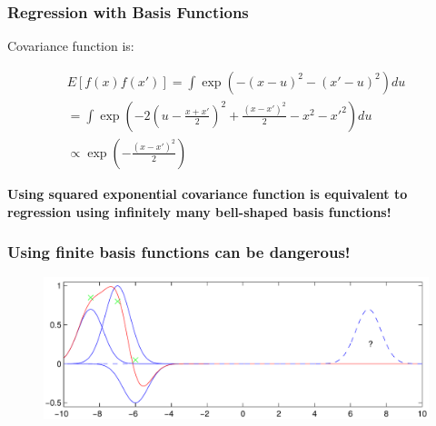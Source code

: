 \documentclass[10pt]{beamer}
\begin{document}
  \begin{frame}
    \frametitle{Regression with Basis Functions}

    Covariance function is:

    \begin{equation*}
      \begin{array}{c}
        E[f(x)f(x')] = \int \exp ( - (x-u)^2 - (x' - u)^2)du \\[0.2cm]
        = \int \exp \left( -2 \left( u - \frac{x + x'}{2} \right)^2 + \frac{(x- x')^2}{2} - x^2 -x'^2 \right) du \\[0.2cm]
        \propto \exp \left( - \frac{(x - x')^2}{2} \right)
      \end{array}
    \end{equation*}

    \pause

    \begin{center}
      \textbf{Using squared exponential covariance function is equivalent to regression using infinitely many bell-shaped basis functions!}
    \end{center}
  \end{frame}

  \begin{frame}
    \frametitle{Using finite basis functions can be dangerous!}

    \begin{figure}
      \centering
      \includegraphics[width=\textwidth]{finiteBasis.png}
    \end{figure}
  \end{frame}
\end{document}
